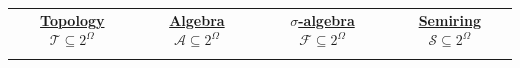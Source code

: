 \begin{tabular}{|c|c|c|c|}
\hline



\begin{minipage}[t]{\colfracsize\textwidth}
\raggedright
\textbf{\footnotesize \hyperref[def:topology]{Topology \(\mathcal{T}\subseteq 2^\Omega\)}}
\end{minipage}
&
\begin{minipage}[t]{\colfracsize\textwidth}
\raggedright
\textbf{\footnotesize \hyperref[def:algebra]{Algebra \(\mathcal{A}\subseteq 2^\Omega\)}}
\end{minipage}
&
\begin{minipage}[t]{\colfracsize\textwidth}
\raggedright
\textbf{\footnotesize \hyperref[def:sigma-algebra]{\(\sigma\)-algebra \(\mathcal{F}\subseteq 2^\Omega\)}}
\end{minipage}
&
\begin{minipage}[t]{\colfracsize\textwidth}
\raggedright
\textbf{\footnotesize \hyperref[def:semiring]{Semiring \(\mathcal{S}\subseteq 2^\Omega\)}}
\end{minipage}
\\[0ex]
\hhline{|=|=|=|=|}



\end{tabular}
